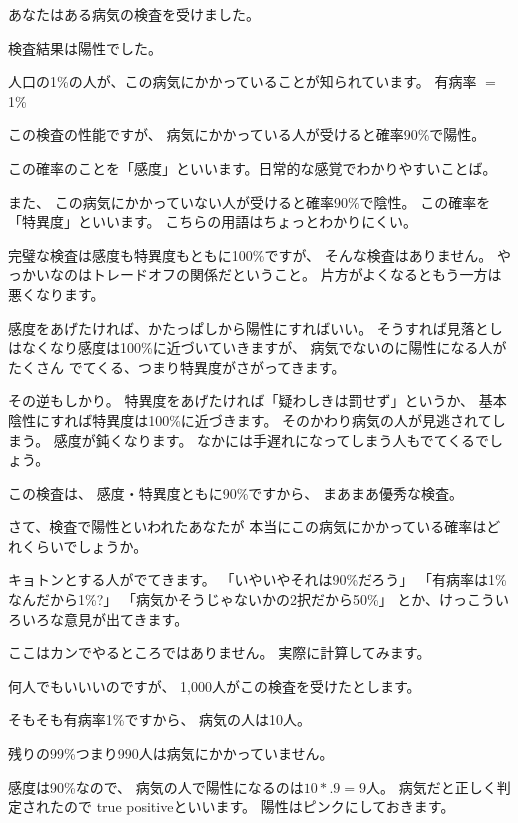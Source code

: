 \documentclass[uplatex,jis2004,dvipdfmx,12pt]{jsarticle}
\begin{document}
あなたはある病気の検査を受けました。

検査結果は陽性でした。

人口の1\%の人が、この病気にかかっていることが知られています。
有病率 $=$ 1\%

この検査の性能ですが、
病気にかかっている人が受けると確率90\%で陽性。

この確率のことを「感度」といいます。日常的な感覚でわかりやすいことば。

また、
この病気にかかっていない人が受けると確率90\%で陰性。
この確率を「特異度」といいます。
こちらの用語はちょっとわかりにくい。


完璧な検査は感度も特異度もともに100\%ですが、
そんな検査はありません。
やっかいなのはトレードオフの関係だということ。
片方がよくなるともう一方は悪くなります。

感度をあげたければ、かたっぱしから陽性にすればいい。
そうすれば見落としはなくなり感度は100\%に近づいていきますが、
病気でないのに陽性になる人がたくさん
でてくる、つまり特異度がさがってきます。

その逆もしかり。
特異度をあげたければ「疑わしきは罰せず」というか、
基本陰性にすれば特異度は100\%に近づきます。
そのかわり病気の人が見逃されてしまう。
感度が鈍くなります。
なかには手遅れになってしまう人もでてくるでしょう。

この検査は、
感度・特異度ともに90\%ですから、
まあまあ優秀な検査。


さて、検査で陽性といわれたあなたが
本当にこの病気にかかっている確率はどれくらいでしょうか。

キョトンとする人がでてきます。
「いやいやそれは90\%だろう」
「有病率は1\%なんだから1\%?」
「病気かそうじゃないかの2択だから50\%」
とか、けっこういろいろな意見が出てきます。

ここはカンでやるところではありません。
実際に計算してみます。


何人でもいいいのですが、
1,000人がこの検査を受けたとします。


そもそも有病率1\%ですから、
病気の人は10人。

残りの99\%つまり990人は病気にかかっていません。

感度は90\%なので、
病気の人で陽性になるのは$10*.9=9$人。
病気だと正しく判定されたので
true positiveといいます。
陽性はピンクにしておきます。
\end{document}
